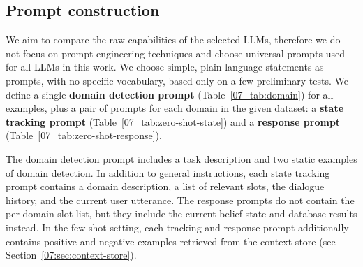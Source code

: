 

\subsection{Prompt construction}
\label{07:sec:prompts}
We aim to compare the raw capabilities of the selected LLMs, therefore we do not focus on prompt engineering techniques and choose universal prompts used for all LLMs in this work.
We choose simple, plain language statements as prompts, with no specific vocabulary, based only on a few preliminary tests.
We define a single \textbf{domain detection prompt} (Table~\ref{07_tab:domain}) for all examples, plus a pair of prompts for each domain in the given dataset: a \textbf{state tracking prompt} (Table~\ref{07_tab:zero-shot-state}) and a \textbf{response prompt} (Table~\ref{07_tab:zero-shot-response}).

The domain detection prompt includes a task description and two static examples of domain detection.
In addition to general instructions, each state tracking prompt contains a domain description, a list of relevant slots, the dialogue history, and the current user utterance.
The response prompts do not contain the per-domain slot list, but they include the current belief state and database results instead.
In the few-shot setting, each tracking and response prompt additionally contains positive and negative examples retrieved from the context store (see Section~\ref{07:sec:context-store}).

